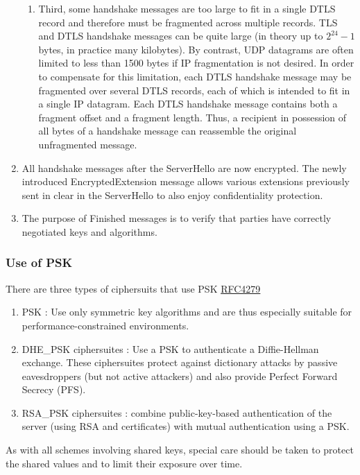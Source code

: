 \begin{enumerate}
\begin{enumerate}
\item	Third, some handshake messages are too large to fit in a single DTLS record and therefore must be fragmented across multiple records. TLS and DTLS handshake messages can be quite large (in theory up to \(2^{24}-1\) bytes, in practice many kilobytes). By contrast, UDP datagrams are often limited to less than 1500 bytes if IP fragmentation is not desired. In order to compensate for this 	limitation, each DTLS handshake message may be fragmented over several DTLS records, each of which is intended to fit in a single IP datagram. Each DTLS handshake message contains both a fragment offset and a fragment length. Thus, a recipient in possession of all bytes of a handshake message can reassemble the original unfragmented message.

\end{enumerate}
    \item All handshake messages after the ServerHello are now encrypted. The newly introduced EncryptedExtension message allows various extensions previously sent in clear in the ServerHello to also enjoy confidentiality protection.
    \item The purpose of Finished messages is to verify that parties have correctly negotiated keys and algorithms.
\end{enumerate}
   
   
\subsubsection{Use of PSK}
There are three types of ciphersuits that use PSK \href{https://tools.ietf.org/html/rfc4279#section-5.1}{RFC4279}

\begin{enumerate}
    \item PSK : Use only symmetric key algorithms and are thus especially suitable for performance-constrained environments. 
    \item DHE\_PSK ciphersuites : Use a PSK to authenticate a Diffie-Hellman exchange.  These ciphersuites protect against dictionary attacks by passive eavesdroppers (but not active attackers) and also provide Perfect Forward Secrecy (PFS).
    \item RSA\_PSK ciphersuites : combine public-key-based authentication of the server (using RSA and certificates) with mutual authentication using a PSK.
\end{enumerate}

As with all schemes involving shared keys, special care should be taken to protect the shared values and to limit their exposure over time.


